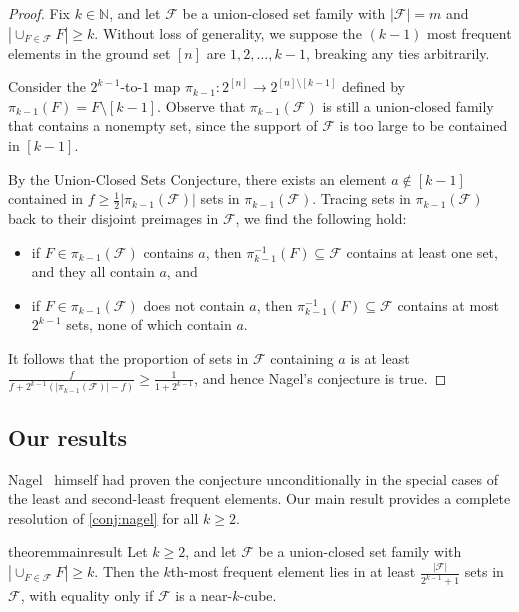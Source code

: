 \documentclass[a4paper,12pt]{article}
\theoremstyle{mystyle}	%
\theoremstyle{definition}
\newcommand{\F}{\mathcal{F}}
\newcommand{\6}{\partial}
\begin{document}
\begin{proof}
    Fix $k \in \mathbb{N}$, and let $\mathcal{F}$ be a union-closed set family with $|\mathcal{F}| = m$ and $|\cup_{F \in \mathcal{F}} F| \ge k$. Without loss of generality, we suppose the $(k-1)$ most frequent elements in the ground set $[n]$ are $1, 2, \hdots, k-1$, breaking any ties arbitrarily.
    
    Consider the $2^{k-1}$-to-$1$ map $\pi_{k-1}: 2^{[n]} \to 2^{[n]\setminus [k-1]}$ defined by $\pi_{k-1}(F) = F \setminus [k-1]$. Observe that $\pi_{k-1}(\mathcal{F})$ is still a union-closed family that contains a nonempty set, since the support of $\mathcal{F}$ is too large to be contained in $[k-1]$.
    
    By the Union-Closed Sets Conjecture, there exists an element $a\notin [k-1]$ contained in ${f \ge \frac12 | \pi_{k-1}(\mathcal{F})|}$ sets in $\pi_{k-1}(\mathcal{F})$. Tracing sets in $\pi_{k-1}(\mathcal{F})$ back to their disjoint preimages in $\mathcal{F}$, we find the following hold:
    
    \begin{itemize}
        \item[(i)] if $F\in \pi_{k-1}(\mathcal{F})$ contains $a$, then $\pi_{k-1}^{-1}(F) \subseteq \mathcal{F}$ contains at least one set, and they all contain $a$, and
        \item[(ii)] if $F\in \pi_{k-1}(\mathcal{F})$ does not contain $a$, then $\pi_{k-1}^{-1}(F) \subseteq \mathcal{F}$ contains at most $2^{k-1}$ sets, none of which contain $a$.
    \end{itemize}
    
    It follows that the proportion of sets in $\mathcal{F}$ containing $a$ is at least $\frac{f}{f+2^{k-1}(|\pi_{k-1}(\mathcal{F})|-f)} \geq \frac{1}{1+2^{k-1}}$, and hence Nagel's conjecture is true.
\end{proof}

\subsection{Our results}

Nagel~\cite{nagel2023notes} himself had proven the conjecture unconditionally in the special cases of the least and second-least frequent elements. Our main result provides a complete resolution of \cref{conj:nagel} for all $k \ge 2$.

\begin{restatable}{theorem}{mainresult}
\label{thm:main}
    Let $k \geq 2$, and let $\mathcal{F}$ be a union-closed set family with $|\cup_{F \in \mathcal{F}} F| \ge k$. Then the $k$th-most frequent element lies in at least $\frac{|\F|}{2^{k-1} + 1}$ sets in $\mathcal{F}$, with equality only if $\mathcal{F}$ is a near-$k$-cube.
\end{restatable}
\end{document}
